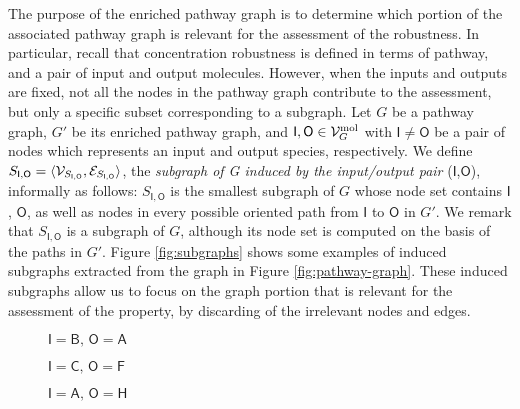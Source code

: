 The purpose of the enriched pathway graph is to determine which portion of the associated pathway graph is relevant for the assessment of the robustness. In particular, recall that concentration robustness is defined in terms of pathway, and a pair of input and output molecules. However, when the inputs and outputs are fixed, not all the nodes in the pathway graph contribute to the assessment, but only a specific subset corresponding to a subgraph. Let $G$ be a pathway graph, $G'$ be its enriched pathway graph, and $\mathsf{I}, \mathsf{O} \in \Cal{V}_G^{\Fun{mol}}$ with $\mathsf{I} \neq \mathsf{O}$ be a pair of nodes which represents an input and output species, respectively. We define $S_{\mathsf{I},\mathsf{O}} = \Tuple{\Cal{V}_{S_{\mathsf{I},\mathsf{O}}}, \Cal{E}_{S_{\mathsf{I},\mathsf{O}}}}$, the \emph{subgraph of G induced by the input/output pair} ($\mathsf{I}$,$\mathsf{O}$), informally as follows: $S_{\mathsf{I},\mathsf{O}}$ is the smallest subgraph of $G$ whose node set contains $\mathsf{I}$, $\mathsf{O}$, as well as nodes in every possible oriented path from $\mathsf{I}$ to $\mathsf{O}$ in $G'$. We remark that $S_{\mathsf{I},\mathsf{O}}$ is a subgraph of $G$, although its node set is computed on the basis of the paths in $G'$. Figure \ref{fig:subgraphs} shows some examples of induced subgraphs extracted from the graph in Figure \ref{fig:pathway-graph}. These induced subgraphs allow us to focus on the graph portion that is relevant for the assessment of the property, by discarding of the irrelevant nodes and edges.
\begin{figure*}[h!]
    \begin{subfigure}[b]{0.24\linewidth}
        \centering
        \resizebox{.9\textwidth}{!}{}
        \caption{$\mathsf{I}=\mathsf{B},\, \mathsf{O}=\mathsf{A}$}\label{subfig:subgraph1}
    \end{subfigure}
    \begin{subfigure}[b]{0.3\linewidth}
        \centering
        \resizebox{.9\textwidth}{!}{}
        \caption{$\mathsf{I}=\mathsf{C},\, \mathsf{O}=\mathsf{F}$}\label{subfig:subgraph2}
    \end{subfigure}
    \begin{subfigure}[b]{0.45\linewidth}
        \centering
        \resizebox{.9\textwidth}{!}{}
        \caption{$\mathsf{I}=\mathsf{A},\, \mathsf{O}=\mathsf{H}$}\label{subfig:subgraph3}
    \end{subfigure}
    \caption{Examples of subgraphs of the pathway graph in Figure \ref{fig:pathway-graph} induced by different input/output node pairs $(\mathsf{I},\mathsf{O})$.}\label{fig:subgraphs}
\end{figure*}
